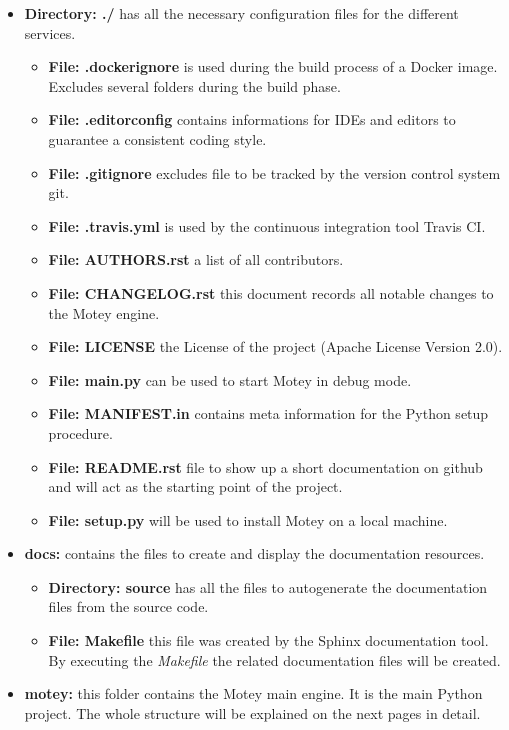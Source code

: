 \begin{itemize}
  \item{\textbf{Directory: ./}} has all the necessary configuration files for the different services.
  \begin{itemize}
    \item{\textbf{File: .dockerignore}} is used during the build process of a Docker image. Excludes several folders during the build phase.
    \item{\textbf{File: .editorconfig}} contains informations for \acp{IDE} and editors to guarantee a consistent coding style.
    \item{\textbf{File: .gitignore}} excludes file to be tracked by the version control system git.
    \item{\textbf{File: .travis.yml}} is used by the continuous integration tool Travis CI.
    \item{\textbf{File: AUTHORS.rst}} a list of all contributors.
    \item{\textbf{File: CHANGELOG.rst}} this document records all notable changes to the Motey engine.
    \item{\textbf{File: LICENSE}} the License of the project (Apache License Version 2.0).
    \item{\textbf{File: main.py}} can be used to start Motey in debug mode.
    \item{\textbf{File: MANIFEST.in}} contains meta information for the Python setup procedure.
    \item{\textbf{File: README.rst}} file to show up a short documentation on github and will act as the starting point of the project.
    \item{\textbf{File: setup.py}} will be used to install Motey on a local machine.
  \end{itemize}
  \item{\textbf{docs:}} contains the files to create and display the documentation resources.
  \begin{itemize}
    \item{\textbf{Directory: source}} has all the files to autogenerate the documentation files from the source code.
    \item{\textbf{File: Makefile}} this file was created by the Sphinx documentation tool. By executing the \textit{Makefile} the related documentation files will be created.
  \end{itemize}
  \item{\textbf{motey:}} this folder contains the Motey main engine. It is the main Python project. The whole structure will be explained on the next pages in detail.

\end{itemize}
